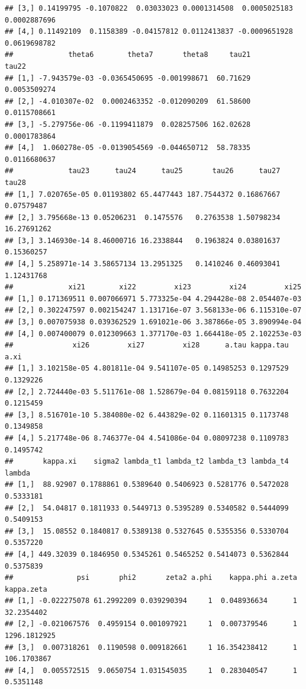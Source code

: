 \documentclass[a4paper, preprint, 3p,
authoryear]{elsarticle} %
\begin{document}
\begin{verbatim}
## [3,] 0.14199795 -0.1070822  0.03033023 0.0001314508  0.0005025183 0.0002887696
## [4,] 0.11492109  0.1158389 -0.04157812 0.0112413837 -0.0009651928 0.0619698782
##             theta6        theta7       theta8     tau21        tau22
## [1,] -7.943579e-03 -0.0365450695 -0.001998671  60.71629 0.0053509274
## [2,] -4.010307e-02  0.0002463352 -0.012090209  61.58600 0.0115708661
## [3,] -5.279756e-06 -0.1199411879  0.028257506 162.02628 0.0001783864
## [4,]  1.060278e-05 -0.0139054569 -0.044650712  58.78335 0.0116680637
##             tau23      tau24      tau25       tau26      tau27       tau28
## [1,] 7.020765e-05 0.01193802 65.4477443 187.7544372 0.16867667  0.07579487
## [2,] 3.795668e-13 0.05206231  0.1475576   0.2763538 1.50798234 16.27691262
## [3,] 3.146930e-14 8.46000716 16.2338844   0.1963824 0.03801637  0.15360257
## [4,] 5.258971e-14 3.58657134 13.2951325   0.1410246 0.46093041  1.12431768
##             xi21        xi22         xi23         xi24         xi25
## [1,] 0.171369511 0.007066971 5.773325e-04 4.294428e-08 2.054407e-03
## [2,] 0.302247597 0.002154247 1.131716e-07 3.568133e-06 6.115310e-07
## [3,] 0.007075938 0.039362529 1.691021e-06 3.387866e-05 3.890994e-04
## [4,] 0.007400079 0.012309663 1.377170e-03 1.664418e-05 2.102253e-03
##              xi26         xi27         xi28      a.tau kappa.tau      a.xi
## [1,] 3.102158e-05 4.801811e-04 9.541107e-05 0.14985253 0.1297529 0.1329226
## [2,] 2.724440e-03 5.511761e-08 1.528679e-04 0.08159118 0.7632204 0.1215459
## [3,] 8.516701e-10 5.384080e-02 6.443829e-02 0.11601315 0.1173748 0.1349858
## [4,] 5.217748e-06 8.746377e-04 4.541086e-04 0.08097238 0.1109783 0.1495742
##       kappa.xi    sigma2 lambda_t1 lambda_t2 lambda_t3 lambda_t4    lambda
## [1,]  88.92907 0.1788861 0.5389640 0.5406923 0.5281776 0.5472028 0.5333181
## [2,]  54.04817 0.1811933 0.5449713 0.5395289 0.5340582 0.5444099 0.5409153
## [3,]  15.08552 0.1840817 0.5389138 0.5327645 0.5355356 0.5330704 0.5357220
## [4,] 449.32039 0.1846950 0.5345261 0.5465252 0.5414073 0.5362844 0.5375839
##               psi       phi2       zeta2 a.phi    kappa.phi a.zeta   kappa.zeta
## [1,] -0.022275078 61.2992209 0.039290394     1  0.048936634      1   32.2354402
## [2,] -0.021067576  0.4959154 0.001097921     1  0.007379546      1 1296.1812925
## [3,]  0.007318261  0.1190598 0.009182661     1 16.354238412      1  106.1703867
## [4,]  0.005572515  9.0650754 1.031545035     1  0.283040547      1    0.5351148
\end{verbatim}
\end{document}
